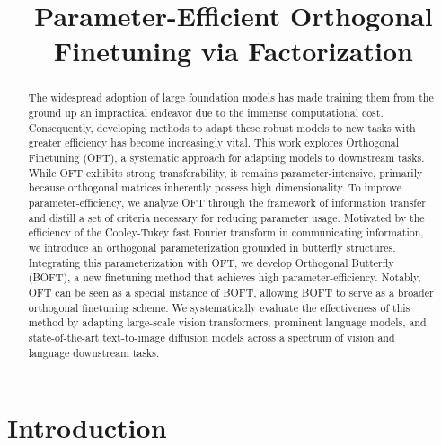 \title{Parameter-Efficient Orthogonal Finetuning via Factorization}

\begin{abstract}
The widespread adoption of large foundation models has made training them from the ground up an impractical endeavor due to the immense computational cost. Consequently, developing methods to adapt these robust models to new tasks with greater efficiency has become increasingly vital. This work explores Orthogonal Finetuning (OFT), a systematic approach for adapting models to downstream tasks. While OFT exhibits strong transferability, it remains parameter-intensive, primarily because orthogonal matrices inherently possess high dimensionality. To improve parameter-efficiency, we analyze OFT through the framework of information transfer and distill a set of criteria necessary for reducing parameter usage. Motivated by the efficiency of the Cooley-Tukey fast Fourier transform in communicating information, we introduce an orthogonal parameterization grounded in butterfly structures. Integrating this parameterization with OFT, we develop Orthogonal Butterfly (BOFT), a new finetuning method that achieves high parameter-efficiency. Notably, OFT can be seen as a special instance of BOFT, allowing BOFT to serve as a broader orthogonal finetuning scheme. We systematically evaluate the effectiveness of this method by adapting large-scale vision transformers, prominent language models, and state-of-the-art text-to-image diffusion models across a spectrum of vision and language downstream tasks.
\end{abstract}

\section{Introduction}


